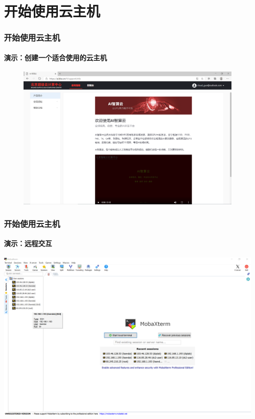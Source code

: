 \documentclass[10pt]{beamer}
\begin{document}
    \section{开始使用云主机}
        \begin{frame}
            \frametitle{开始使用云主机}
                \framesubtitle{演示：创建一个适合使用的云主机}

                \centering
                \begin{figure}
                    \href{https://ai.blsc.cn/}{
                        \includegraphics[width=\textwidth]{src/img/Welcome.png}
                        }
                \end{figure}

        \end{frame}

        \begin{frame}
            \frametitle{开始使用云主机}
                \framesubtitle{演示：远程交互}

                \centering

                \hyperlink{https://mobaxterm.mobatek.net}{
                    \includegraphics[width=\textwidth]{src/img/MobaXterm.png}
                    }

        \end{frame}
\end{document}
